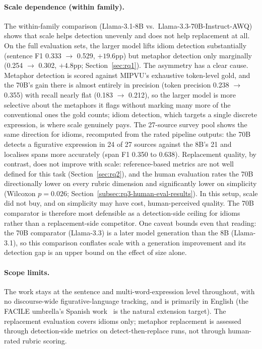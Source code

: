 \paragraph{Scale dependence (within family).} The within-family comparison (Llama-3.1-8B vs.\ Llama-3.3-70B-Instruct-AWQ) shows that scale helps detection unevenly and does not help replacement at all. On the full evaluation sets, the larger model lifts idiom detection substantially (sentence F1 0.333 $\to$ 0.529, $+19.6$pp) but metaphor detection only marginally (0.254 $\to$ 0.302, $+4.8$pp; Section~\ref{sec:rq1}). The asymmetry has a clear cause. Metaphor detection is scored against MIPVU's exhaustive token-level gold, and the 70B's gain there is almost entirely in precision (token precision 0.238 $\to$ 0.355) with recall nearly flat (0.183 $\to$ 0.212), so the larger model is more selective about the metaphors it flags without marking many more of the conventional ones the gold counts; idiom detection, which targets a single discrete expression, is where scale genuinely pays. The 27-source survey pool shows the same direction for idioms, recomputed from the rated pipeline outputs: the 70B detects a figurative expression in 24 of 27 sources against the 8B's 21 and localises spans more accurately (span F1 0.350 to 0.638). Replacement quality, by contrast, does not improve with scale: reference-based metrics are not well defined for this task (Section~\ref{sec:rq2}), and the human evaluation rates the 70B directionally lower on every rubric dimension and significantly lower on simplicity (Wilcoxon $p=0.026$; Section~\ref{subsec:rq3-human-eval-results}). In this setup, scale did not buy, and on simplicity may have cost, human-perceived quality. The 70B comparator is therefore most defensible as a detection-side ceiling for idioms rather than a replacement-side competitor. One caveat bounds even that reading: the 70B comparator (Llama-3.3) is a later model generation than the 8B (Llama-3.1), so this comparison conflates scale with a generation improvement and its detection gap is an upper bound on the effect of size alone.

\paragraph{Scope limits.} The work stays at the sentence and multi-word-expression level throughout, with no discourse-wide figurative-language tracking, and is primarily in English (the FACILE umbrella's Spanish work~\cite{Surez-Figueroa2024} is the natural extension target). The replacement evaluation covers idioms only; metaphor replacement is assessed through detection-side metrics on detect-then-replace runs, not through human-rated rubric scoring.

